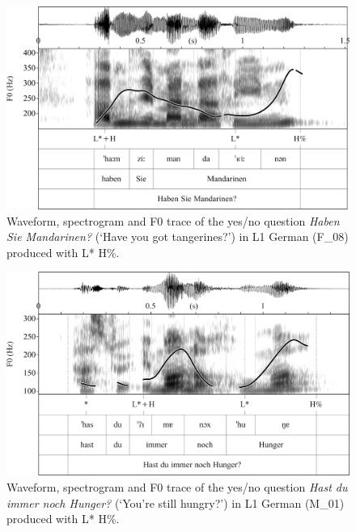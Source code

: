 \begin{figure}


\includegraphics[width=\textwidth]{figures/Figure_4.62.png}



\caption{Waveform, spectrogram and F0 trace of the yes/no question \textit{Haben Sie Mandarinen?} (‘Have you got tangerines?’) in L1 German (F\_08) produced with L* H\%.}
\label{fig:4.62}
\end{figure}

\begin{figure}


\includegraphics[width=\textwidth]{figures/Figure_4.63.png}



\caption{Waveform, spectrogram and F0 trace of the yes/no question \textit{Hast du immer noch Hunger?} (‘You’re still hungry?’) in L1 German (M\_01) produced with L* H\%.}
\label{fig:4.63}
\end{figure}

